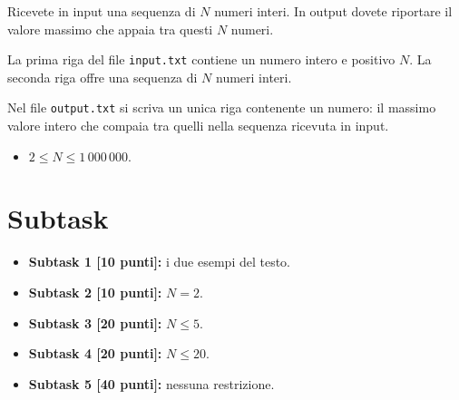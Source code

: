 \renewcommand{\nomebreve}{max\_seq}
\renewcommand{\titolo}{Trovare il massimo in una sequenza}

\introduzione{}

Ricevete in input una sequenza di $N$ numeri interi.
In output dovete riportare il valore massimo che appaia tra questi $N$ numeri.


La prima riga del file \verb'input.txt' contiene un numero intero e positivo $N$.
La seconda riga offre una sequenza di $N$ numeri interi.

Nel file \verb'output.txt' si scriva un unica riga contenente un numero:
il massimo valore intero che compaia tra quelli nella sequenza ricevuta in input.



\begin{itemize}[nolistsep, noitemsep]
  \item $2 \le N \le 1\,000\,000$.
\end{itemize}
  
  \section*{Subtask}
  \begin{itemize}
    \item \textbf{Subtask 1 [10 punti]:} i due esempi del testo.
    \item \textbf{Subtask 2 [10 punti]:} $N = 2$.
    \item \textbf{Subtask 3 [20 punti]:} $N \leq 5$.
    \item \textbf{Subtask 4 [20 punti]:} $N \leq 20$.
    \item \textbf{Subtask 5 [40 punti]:} nessuna restrizione.
  \end{itemize}
  
